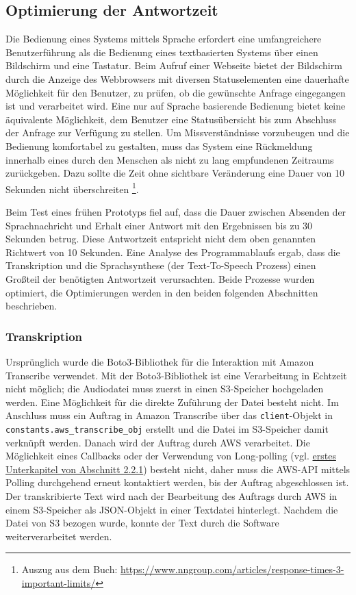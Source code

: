 \subsection{Optimierung der Antwortzeit}

Die Bedienung eines Systems mittels Sprache erfordert eine umfangreichere Benutzerführung als die Bedienung eines textbasierten Systems über einen Bildschirm und eine Tastatur. Beim Aufruf einer Webseite bietet der Bildschirm durch die Anzeige des Webbrowsers mit diversen Statuselementen eine dauerhafte Möglichkeit für den Benutzer, zu prüfen, ob die gewünschte Anfrage eingegangen ist und verarbeitet wird. Eine nur auf Sprache basierende Bedienung bietet keine äquivalente Möglichkeit, dem Benutzer eine Statusübersicht bis zum Abschluss der Anfrage zur Verfügung zu stellen. Um Missverständnisse vorzubeugen und die Bedienung komfortabel zu gestalten, muss das System eine Rückmeldung innerhalb eines durch den Menschen als nicht zu lang empfundenen Zeitraums zurückgeben. Dazu sollte die Zeit ohne sichtbare Veränderung eine Dauer von 10 Sekunden nicht überschreiten \cite[Kapitel 5.5]{response-time}\footnote{Auszug aus dem Buch: \url{https://www.nngroup.com/articles/response-times-3-important-limits/}}. 

Beim Test eines frühen Prototyps fiel auf, dass die Dauer zwischen Absenden der Sprachnachricht und Erhalt einer Antwort mit den Ergebnissen bis zu 30 Sekunden betrug. Diese Antwortzeit entspricht nicht dem oben genannten Richtwert von 10 Sekunden. Eine Analyse des Programmablaufs ergab, dass die Transkription und die Sprachsynthese (der Text-To-Speech Prozess) einen Großteil der benötigten Antwortzeit verursachten. Beide Prozesse wurden optimiert, die Optimierungen werden in den beiden folgenden Abschnitten beschrieben.

\subsubsection{Transkription}
\label{sec:optimierung-transk}

Ursprünglich wurde die Boto3-Bibliothek für die Interaktion mit Amazon Transcribe verwendet. Mit der Boto3-Bibliothek ist eine Verarbeitung in Echtzeit nicht möglich; die Audiodatei muss zuerst in einen S3-Speicher hochgeladen werden. Eine Möglichkeit für die direkte Zuführung der Datei besteht nicht. Im Anschluss muss ein Auftrag in Amazon Transcribe über das \lstinline{client}-Objekt in \lstinline{constants.aws_transcribe_obj} erstellt und die Datei im S3-Speicher damit verknüpft werden. Danach wird der Auftrag durch AWS verarbeitet. Die Möglichkeit eines Callbacks oder der Verwendung von Long-polling (vgl. \hyperref[sec:telegram-getting-updates]{erstes Unterkapitel von Abschnitt 2.2.1}) besteht nicht, daher muss die AWS-API mittels Polling durchgehend erneut kontaktiert werden, bis der Auftrag abgeschlossen ist. Der transkribierte Text wird nach der Bearbeitung des Auftrags durch AWS in einem S3-Speicher als JSON-Objekt in einer Textdatei hinterlegt. Nachdem die Datei von S3 bezogen wurde, konnte der Text durch die Software weiterverarbeitet werden.

